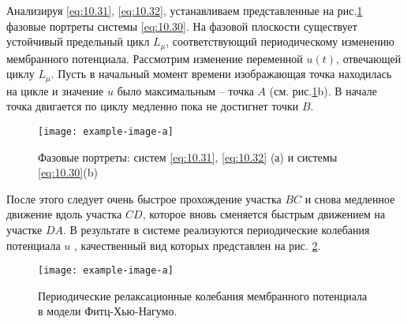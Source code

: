 Анализируя \eqref{eq:10.31}, \eqref{eq:10.32}, устанавливаем представленные на рис.\ref{fig:10.7}
фазовые портреты системы \eqref{eq:10.30}. На фазовой плоскости существует устойчивый
предельный цикл $L_{\mu}$, соответствующий периодическому изменению мембранного потенциала.
Рассмотрим изменение переменной $u(t)$, отвечающей циклу $L_{\mu}$. Пусть в начальный момент времени
изображающая точка находилась на цикле и значение $u$ было максимальным -- точка $A$ 
(см. рис.\ref{fig:10.7}b). В начале точка двигается по циклу медленно пока не достигнет точки
$B$.
\begin{figure}[h]
        \centering
        \texttt{[image: example-image-a]}
        \caption{Фазовые портреты: систем \eqref{eq:10.31}, \eqref{eq:10.32} (а) и системы \eqref{eq:10.30}(b)}
        \label{fig:10.7}
\end{figure}
После этого следует очень быстрое прохождение участка $BC$ и снова медленное
движение вдоль участка $CD$, которое вновь сменяется быстрым движением на
участке $DA$. В результате в системе реализуются периодические колебания
потенциала $u$ , качественный вид которых представлен на рис. \ref{fig:10.8}.
\begin{figure}[h]
        \centering
        \texttt{[image: example-image-a]}
        \caption{Периодические релаксационные колебания мембранного потенциала в модели 
        Фитц-Хью-Нагумо.}
        \label{fig:10.8}
\end{figure}

